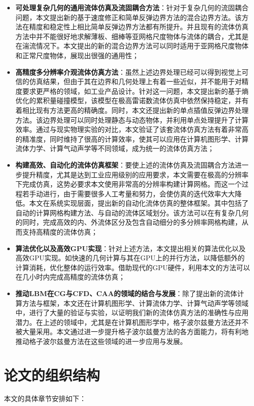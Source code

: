 \begin{itemize}
    \item \textbf{可处理复杂几何的通用流体仿真及流固耦合方法}：针对于复杂几何的流固耦合问题，本文提出新的基于速度修正和简单反弹边界方法的混合边界方法。该方法在精度和稳定性上相比简单反弹边界方法都有所提升。并且现有的流体仿真方法中并不能很好地求解薄板、细棒等亚网格尺度物体与流体的耦合，尤其是在湍流情况下。本文提出的新的混合边界方法可以同时适用于亚网格尺度物体和正常尺度物体，展现出很强的通用性；
    \item \textbf{高精度多分辨率介观流体仿真方法}：虽然上述边界处理已经可以得到视觉上可信的仿真结果，但由于其在边界和几何处理上有着一些近似，并不能用于对精度要求更严格的领域，如工业产品设计。针对这一问题，本文提出新的基于熵优化的累积量碰撞模型，该模型在极高雷诺数流体仿真中依然保持稳定，并有着相比现有方法更高的精确度。同时，本文还提出新的单点插值反弹边界处理方法。该边界处理可以同时处理静态与动态物体，并利用单点处理提升了计算效率。通过与现实物理实验的对比，本文验证了该套流体仿真方法有着非常高的精准度，同时维持了很高的计算效率，使其可以应用在计算机图形学、计算流体力学、计算气动声学等不同领域，成为统一的流体仿真方法；
    \item \textbf{构建高效、自动化的流体仿真框架}：要使上述的流体仿真及流固耦合方法进一步提升精度，尤其是达到工业应用级别的应用要求，本文需要在极高的分辨率下完成仿真，这势必要求本文使用非常高的分辨率构建计算网格。而这一个过程若手动进行，由于需要很多人工考量和努力，会使仿真的迭代效率大大降低。本文在系统实现层面，提出新的自动化流体仿真的整体框架。其中包括了自动的计算网格构建方法、与自动的流体区域划分。该方法可以在有复杂几何的同时，完成高效的内、外流体区分及包含自动细分的多分辨率网格构建，从而支持高精度的流体仿真；
    \item \textbf{算法优化以及高效GPU实现}：针对上述方法，本文提出相关的算法优化以及高效GPU实现。如快速的几何计算与其在GPU上的并行方法，以降低额外的计算消耗，优化整体的运行效率。借助现代的GPU硬件，利用本文的方法可以在几小时内完成高精度的流体仿真；
    \item \textbf{推动LBM在CG与CFD、CAA的领域的结合与发展}：除了提出新的流体计算方法与框架，本文还在计算机图形学、计算流体力学、计算气动声学等领域中，进行了大量的验证与实验，以证明我们新的流体仿真方法的准确性与应用潜力。在上述的领域中，尤其是在计算机图形学中，格子波尔兹曼方法还并不被大量采用。本文通过进一步提升格子波尔兹曼方法的各方面能力，将有利地推动格子波尔兹曼方法在这些领域的进一步应用与发展。
\end{itemize}

\section{论文的组织结构}
本文的具体章节安排如下：

